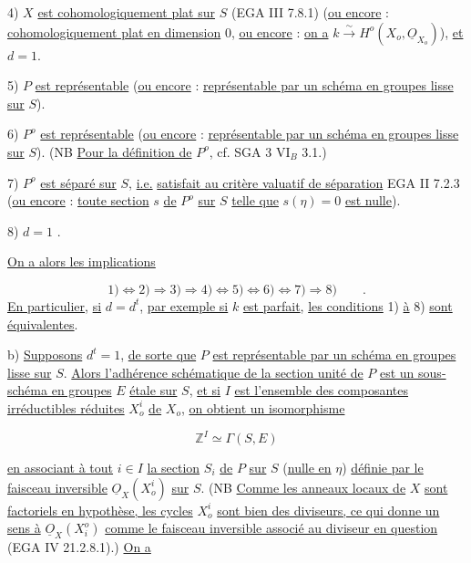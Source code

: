 
4) $X$ \underline{est cohomologiquement plat sur} $S$ (EGA III 7.8.1) (\underline{ou encore} : \underline{cohomologiquement plat en dimension} $0$, \underline{ou encore} : \underline{on a} $k \stackrel{\sim}{\longrightarrow} H^o(X_o,\underline{O}_{X_o})$), \underline{et} $d=1$.

5) $P$ \underline{est représentable} (\underline{ou encore} : \underline{représentable par un schéma en groupes lisse sur} $S$).

6) $P^o$ \underline{est représentable} (\underline{ou encore} : \underline{représentable par un schéma en groupes lisse sur} $S$). (NB \underline{Pour la définition de} $P^o$, cf. SGA 3 $\mathrm{VI}_B$ 3.1.)

7) $P^o$ \underline{est séparé sur} $S$, \underline{i.e.} \underline{satisfait au critère valuatif de séparation} EGA II 7.2.3 (\underline{ou encore} : \underline{toute section} $s$ \underline{de} $P^o$ \underline{sur} $S$ \underline{telle que} $s(\eta) = 0$ \underline{est nulle}).

8) $d=1$ .

\underline{On a alors les implications}

\begin{equation}\tag{12.1.4}
1) \Longleftrightarrow 2) \Longrightarrow 3) \Longrightarrow 4) \Longleftrightarrow 5) \Longleftrightarrow 6) \Longleftrightarrow 7) \Longrightarrow 8) \qquad .
\end{equation}
\underline{En particulier}, \underline{si} $d=d^t$, \underline{par exemple si} $k$ \underline{est parfait}, \underline{les conditions} 1) \underline{à} 8) \underline{sont équivalentes}.

b) \underline{Supposons} $d^t=1$, \underline{de sorte que} $P$ \underline{est représentable par un schéma en groupes lisse sur} $S$. \underline{Alors l'adhérence schématique de la section unité de} $P$ \underline{est un sous-schéma en groupes} $E$ \underline{étale sur} $S$, \underline{et si} $I$ \underline{est l'ensemble des composantes irréductibles réduites} $X_o^i$ \underline{de} $X_o$, \underline{on obtient un isomorphisme}

\begin{equation}\tag{12.1.5}
\mathbb{Z}^I \simeq \Gamma(S,E)
\end{equation}


\underline{en associant à tout} $i \in I$ \underline{la section} $S_i$ \underline{de} $P$ \underline{sur} $S$ (\underline{nulle en} $\eta$) \underline{définie par le faisceau inversible} $\underline{O}_X(X_o^i)$ \underline{sur} $S$. (NB \underline{Comme les anneaux locaux de} $X$ \underline{sont factoriels en hypothèse, les cycles} $X_o^i$ \underline{sont bien des diviseurs, ce qui donne un sens à} $\underline{O}_X(X_i^o)$ \underline{comme le faisceau inversible associé au diviseur en question} (EGA IV 21.2.8.1).) \underline{On a}

